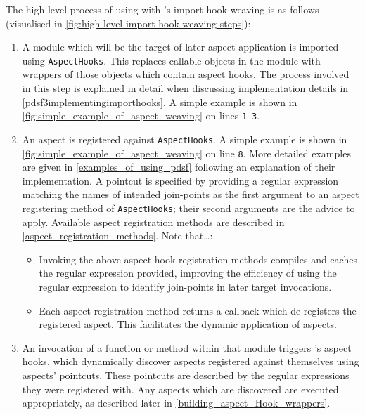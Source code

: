 The high-level process of using \aop{} with \pdsf{}'s import hook weaving is as
follows (visualised in \cref{fig:high-level-import-hook-weaving-steps}):

\begin{enumerate}\label{urgency_mentioned_in_passing}
    \item A module which will be the target of later aspect application is
    imported using \lstinline{AspectHooks}. This replaces callable objects in
    the module with wrappers of those objects which contain aspect hooks. The
    process involved in this step is explained in detail when discussing
    implementation details in \cref{pdsf3implementingimporthooks}. A simple
    example is shown in \cref{fig:simple_example_of_aspect_weaving} on lines
    \texttt{1}--\texttt{3}. 
    \item An aspect is registered against \lstinline{AspectHooks}. A simple
    example is shown in \cref{fig:simple_example_of_aspect_weaving} on line
    \texttt{8}. More detailed examples are given in
    \cref{examples_of_using_pdsf} following an explanation of their
    implementation. A pointcut is specified by providing a regular expression
    matching the names of intended join-points as the first argument to an
    aspect registering method of \lstinline{AspectHooks}; their second arguments
    are the advice to apply. Available aspect registration methods are described
    in \cref{aspect_registration_methods}. Note that\ldots{}:
    \begin{itemize}
        \item Invoking the above aspect hook registration methods compiles and
        caches the regular expression provided, improving the efficiency of
        using the regular expression to identify join-points in later target
        invocations.
        \item Each aspect registration method returns a callback which de-registers
        the registered aspect. This facilitates the dynamic application of
        aspects.
    \end{itemize}
    \item  An invocation of a function or method within that module triggers
    \pdsf{}'s aspect hooks, which dynamically discover aspects registered
    against themselves using aspects' pointcuts. These pointcuts are described
    by the regular expressions they were registered with. Any aspects which are
    discovered are executed appropriately, as described later in
    \cref{building_aspect_Hook_wrappers}.
\end{enumerate}

